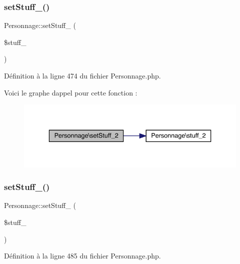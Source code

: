 \subsubsection{\texorpdfstring{set\+Stuff\+\_()}{setStuff\_2()}}
{\footnotesize\ttfamily Personnage\+::set\+Stuff\+\_ (\begin{DoxyParamCaption}\item[{}]{\$stuff\+\_ }\end{DoxyParamCaption})}



Définition à la ligne 474 du fichier Personnage.\+php.

Voici le graphe d\textquotesingle{}appel pour cette fonction \+:\nopagebreak
\begin{figure}[H]
\begin{center}
\leavevmode
\includegraphics[width=336pt]{class_personnage_abbfd017defe625b98830231b7bfa8f94_cgraph}
\end{center}
\end{figure}
\mbox{\label{class_personnage_a48859f66a778f1d3f594fb5b446895a3}} 
\subsubsection{\texorpdfstring{set\+Stuff\+\_()}{setStuff\_3()}}
{\footnotesize\ttfamily Personnage\+::set\+Stuff\+\_ (\begin{DoxyParamCaption}\item[{}]{\$stuff\+\_ }\end{DoxyParamCaption})}



Définition à la ligne 485 du fichier Personnage.\+php.


